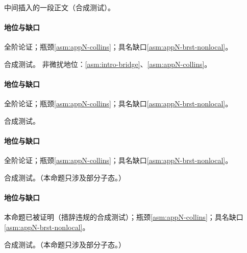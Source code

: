 中间插入的一段正文（合成测试）。

\paragraph{地位与缺口}全阶论证；瓶颈\cref{asm:appN-collins}；具名缺口\cref{asm:appN-brst-nonlocal}。

\begin{proposition}\label{prop:dy-npline}
合成测试。
非微扰地位：\cref{asm:intro-bridge}、\cref{asm:appN-collins}。
\end{proposition}

\paragraph{地位与缺口}全阶论证；瓶颈\cref{asm:appN-collins}；具名缺口\cref{asm:appN-brst-nonlocal}。

\begin{proposition}\label{prop:dy-hadron}
合成测试。
\end{proposition}

\paragraph{地位与缺口}全阶论证；瓶颈\cref{asm:appN-collins}；具名缺口\cref{asm:appN-brst-nonlocal}。

\begin{proposition}\label{prop:dy-forbidden}
合成测试。（本命题只涉及部分子态。）
\end{proposition}

\paragraph{地位与缺口}本命题已被证明（措辞违规的合成测试）；瓶颈\cref{asm:appN-collins}；具名缺口\cref{asm:appN-brst-nonlocal}。

\begin{proposition}\label{prop:dy-ctech}
合成测试。（本命题只涉及部分子态。）
\end{proposition}

